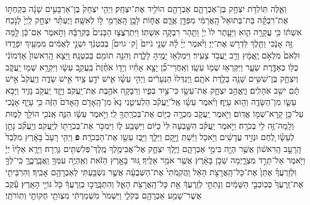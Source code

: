 \documentclass[twoside, openany, parskip=half, 11pt]{book}
\begin{document}
\begin{footnotesize}
\begin{multicols}{2}
\\
 וְאֵ֛לֶּה תּֽוֹלְדֹ֥ת יִצְחָ֖ק בֶּן־אַבְרָהָ֑ם אַבְרָהָ֖ם הוֹלִ֥יד אֶת־יִצְחָֽק׃ וַיְהִ֤י יִצְחָק֙ בֶּן־אַרְבָּעִ֣ים שָׁנָ֔ה בְּקַחְתּ֣וֹ אֶת־רִבְקָ֗ה בַּת־בְּתוּאֵל֙ הָֽאֲרַמִּ֔י מִפַּדַּ֖ן אֲרָ֑ם אֲח֛וֹת לָבָ֥ן הָֽאֲרַמִּ֖י ל֥וֹ לְאִשָּֽׁה׃ וַיֶּעְתַּ֨ר יִצְחָ֤ק לַֽיְיָ֙ לְנֹ֣כַח אִשְׁתּ֔וֹ כִּ֥י עֲקָרָ֖ה הִ֑וא וַיֵּעָ֤תֶר לוֹ֙ יְיָ֔ וַתַּ֖הַר רִבְקָ֥ה אִשְׁתּֽוֹ׃ וַיִּתְרֹֽצֲצ֤וּ הַבָּנִים֙ בְּקִרְבָּ֔הּ וַתֹּ֣אמֶר אִם־כֵּ֔ן לָ֥מָּה זֶּ֖ה אָנֹ֑כִי וַתֵּ֖לֶךְ לִדְר֥שׁ אֶת־יְיָ׃  וַיֹּ֨אמֶר יְיָ֜ לָ֗הּ שְׁנֵ֤י גֹייִם֙ [ק‘ גוֹיִם֙] בְּבִטְנֵ֔ךְ וּשְׁנֵ֣י לְאֻמִּ֔ים מִמֵּעַ֖יִךְ יִפָּרֵ֑דוּ וּלְאֹם֙ מִלְאֹ֣ם יֶֽאֱמָ֔ץ וְרַ֖ב יַֽעֲבֹ֥ד צָעִֽיר׃ וַיִּמְלְא֥וּ יָמֶ֖יהָ לָלֶ֑דֶת וְהִנֵּ֥ה תוֹמִ֖ם בְּבִטְנָֽהּ׃ וַיֵּצֵ֤א הָֽרִאשׁוֹן֙ אַדְמוֹנִ֔י כֻּלּ֖וֹ כְּאַדֶּ֣רֶת שֵׂעָ֑ר וַיִּקְרְא֥וּ שְׁמ֖וֹ עֵשָֽׂו׃ וְאַֽחֲרֵי־כֵ֞ן יָצָ֣א אָחִ֗יו וְיָד֤וֹ אֹחֶ֨זֶת֙ בַּֽעֲקֵ֣ב עֵשָׂ֔ו וַיִּקְרָ֥א שְׁמ֖וֹ יַֽעֲקֹ֑ב וְיִצְחָ֛ק בֶּן־שִׁשִּׁ֥ים שָׁנָ֖ה בְּלֶ֥דֶת אֹתָֽם׃  וַֽיִּגְדְּלוּ֙ הַנְּעָרִ֔ים וַיְהִ֣י עֵשָׂ֗ו אִ֛ישׁ יֹדֵ֥עַ צַ֖יִד אִ֣ישׁ שָׂדֶ֑ה וְיַֽעֲקֹב֙ אִ֣ישׁ תָּ֔ם ישֵׁ֖ב אֹֽהָלִֽים׃ וַיֶּֽאֱהַ֥ב יִצְחָ֛ק אֶת־עֵשָׂ֖ו כִּי־צַ֣יִד בְּפִ֑יו וְרִבְקָ֖ה אֹהֶ֥בֶת אֶת־יַֽעֲקֹֽב׃ וַיָּ֥זֶד יַֽעֲקֹ֖ב נָזִ֑יד וַיָּבֹ֥א עֵשָׂ֛ו מִן־הַשָּׂדֶ֖ה וְה֥וּא עָיֵֽף׃ וַיֹּ֨אמֶר עֵשָׂ֜ו אֶֽל־יַֽעֲקֹ֗ב הַלְעִיטֵ֤נִי נָא֙ מִן־הָֽאָדֹ֤ם הָֽאָדֹם֙ הַזֶּ֔ה כִּ֥י עָיֵ֖ף אָנֹ֑כִי עַל־כֵּ֥ן קָֽרָא־שְׁמ֖וֹ אֱדֽוֹם׃ וַיֹּ֖אמֶר יַֽעֲקֹ֑ב מִכְרָ֥ה כַיּ֛וֹם אֶת־בְּכֹרָֽתְךָ֖ לִֽי׃ וַיֹּ֣אמֶר עֵשָׂ֔ו הִנֵּ֛ה אָֽנֹכִ֥י הוֹלֵ֖ךְ לָמ֑וּת וְלָֽמָּה־זֶּ֥ה לִ֖י בְּכֹרָֽה׃ וַיֹּ֣אמֶר יַֽעֲקֹ֗ב הִשָּׁ֤בְעָה לִּי֙ כַּיּ֔וֹם וַיִּשָּׁבַ֖ע ל֑וֹ וַיִּמְכֹּ֥ר אֶת־בְּכֹֽרָת֖וֹ לְיַֽעֲקֹֽב׃ וְיַֽעֲקֹ֞ב נָתַ֣ן לְעֵשָׂ֗ו לֶ֚חֶם וּנְזִ֣יד עֲדָשִׁ֔ים וַיֹּ֣אכַל וַיֵּ֔שְׁתְּ וַיָּ֖קָם וַיֵּלַ֑ךְ וַיִּ֥בֶז עֵשָׂ֖ו אֶת־הַבְּכֹרָֽה׃ \textbf{פ} 
וַיְהִ֤י רָעָב֙ בָּאָ֔רֶץ מִלְּבַד֙ הָֽרָעָ֣ב הָֽרִאשׁ֔וֹן אֲשֶׁ֥ר הָיָ֖ה בִּימֵ֣י אַבְרָהָ֑ם וַיֵּ֧לֶךְ יִצְחָ֛ק אֶל־אֲבִימֶ֥לֶךְ מֶֽלֶךְ־פְּלִשְׁתִּ֖ים גְּרָֽרָה׃ וַיֵּרָ֤א אֵלָיו֙ יְיָ֔ וַיֹּ֖אמֶר אַל־תֵּרֵ֣ד מִצְרָ֑יְמָה שְׁכֹ֣ן בָּאָ֔רֶץ אֲשֶׁ֖ר אֹמַ֥ר אֵלֶֽיךָ׃ גּ֚וּר בָּאָ֣רֶץ הַזֹּ֔את וְאֶֽהְיֶ֥ה עִמְּךָ֖ וַֽאֲבָֽרֲכֶ֑ךָּ כִּֽי־לְךָ֣ וּֽלְזַרְעֲךָ֗ אֶתֵּן֙ אֶת־כָּל־הָֽאֲרָצֹ֣ת הָאֵ֔ל וַֽהֲקִֽמֹתִי֙ אֶת־הַשְּׁבֻעָ֔ה אֲשֶׁ֥ר נִשְׁבַּ֖עְתִּי לְאַבְרָהָ֥ם אָבִֽיךָ׃ וְהִרְבֵּיתִ֤י אֶת־זַֽרְעֲךָ֙ כְּכֽוֹכְבֵ֣י הַשָּׁמַ֔יִם וְנָתַתִּ֣י לְזַֽרְעֲךָ֔ אֵ֥ת כָּל־הָֽאֲרָצֹ֖ת הָאֵ֑ל וְהִתְבָּֽרֲכ֣וּ בְזַֽרְעֲךָ֔ כֹּ֖ל גּוֹיֵ֥י הָאָֽרֶץ׃ עֵ֕קֶב אֲשֶׁר־שָׁמַ֥ע אַבְרָהָ֖ם בְּקֹלִ֑י וַיִּשְׁמֹר֙ מִשְׁמַרְתִּ֔י מִצְוֹתַ֖י חֻקּוֹתַ֥י וְתֽוֹרֹתָֽי׃


\end{multicols}
\end{footnotesize}
\end{document}
